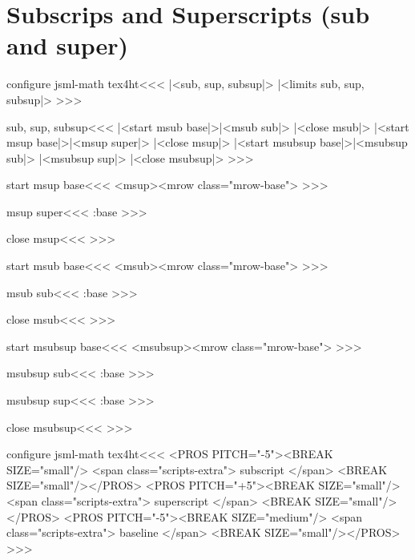 {\section{Subscrips and Superscripts (sub and super)}

\<configure jsml-math tex4ht\><<<
|<sub, sup, subsup|>            
|<limits sub, sup, subsup|>     
>>>

\<sub, sup, subsup\><<<
   {
     {|<start msub base|>}|<msub sub|>}
   {|<close msub|>}
   {
   {|<start msup base|>}|<msup super|>}
   {|<close msup|>}
   {
   {|<start msubsup base|>}|<msubsup sub|>}
   {|<msubsup sup|>}
   {|<close msubsup|>}
>>>



\<start msup base\><<<
<msup><mrow class="mrow-base"\Hnewline>%
>>>

\<msup super\><<<
\trap:base
>>>

\<close msup\><<<
%
>>>



\<start msub base\><<<
<msub><mrow class="mrow-base"\Hnewline>%
>>>



\<msub sub\><<<
\trap:base
>>>

\<close msub\><<<
%
>>>

% 
% 

\<start msubsup base\><<<
<msubsup><mrow class="mrow-base"\Hnewline>%
>>>

\<msubsup sub\><<<
\trap:base
>>>


\<msubsup sup\><<<
\trap:base
>>>


\<close msubsup\><<<
%
>>>

\<configure jsml-math tex4ht\><<<
   {<PROS PITCH="-5"><BREAK SIZE="small"/> 
    <span class="scripts-extra"> subscript </span>
    <BREAK SIZE="small"/></PROS>}
   {<PROS PITCH="+5"><BREAK SIZE="small"/> 
    <span class="scripts-extra"> superscript </span>
    <BREAK SIZE="small"/></PROS>}
   {<PROS PITCH="-5"><BREAK SIZE="medium"/> 
    <span class="scripts-extra"> baseline </span>
    <BREAK SIZE="small"/></PROS>}
>>>



}
